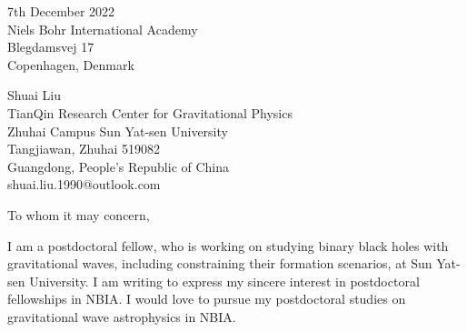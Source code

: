 \documentclass[11pt,a4paper,sans]{letter} %
\date{}
\begin{document}

\begin{letter}{7th December 2022 \\
Niels Bohr International Academy\\
Blegdamsvej 17\\ 
Copenhagen, Denmark}

Shuai Liu \\
TianQin Research Center for Gravitational Physics \\
Zhuhai Campus Sun Yat-sen University \\
Tangjiawan, Zhuhai 519082 \\
Guangdong, People's Republic of China \\
shuai.liu.1990@outlook.com








\opening{To whom it may concern,} 
 I am a postdoctoral fellow, who is working on 
 studying binary black holes with gravitational waves, including constraining their formation scenarios, at Sun Yat-sen University. I am writing to express my sincere interest in postdoctoral fellowships in NBIA. I would love to
pursue my postdoctoral studies on gravitational wave astrophysics in NBIA. 


\end{letter}
\end{document}
